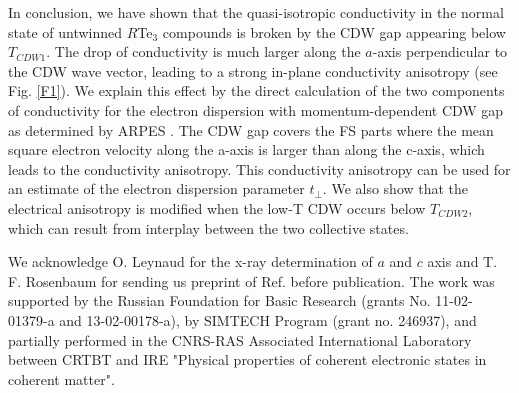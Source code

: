 In conclusion, we have shown that the quasi-isotropic conductivity
in the normal state of untwinned $R$Te$_{3}$ compounds is broken by
the CDW gap appearing below $T_{CDW1}$. The drop of conductivity is
much larger along the $a$-axis perpendicular to the CDW wave vector,
leading to a strong in-plane conductivity anisotropy (see Fig.
\ref{F1}). We explain this effect by the direct calculation of the
two components of conductivity for the electron dispersion with
momentum-dependent CDW gap as determined by ARPES . The CDW gap
covers the FS parts where the mean square electron velocity along
the a-axis is larger than along the c-axis, which leads to the
conductivity anisotropy. This conductivity anisotropy can be used
for an estimate of the electron dispersion parameter $t_{\perp }$.
We also show that the electrical anisotropy is modified when the
low-T CDW occurs below $T_{CDW2}$, which can result from interplay
between the two collective states.

We acknowledge O. Leynaud for the x-ray determination of $a$ and $c$
axis and T. F. Rosenbaum for sending us preprint of Ref. \cite{BB}
before publication. The work was supported by the Russian Foundation
for Basic Research (grants No. 11-02-01379-a and 13-02-00178-a), by
SIMTECH Program (grant no. 246937), and partially performed in the
CNRS-RAS Associated International Laboratory between CRTBT and IRE
"Physical properties of coherent electronic states in coherent
matter".

